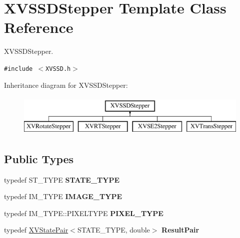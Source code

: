 \hypertarget{class_XVSSDStepper}{
\section{XVSSDStepper  Template Class Reference}
\label{XVSSDStepper}
}
XVSSDStepper. 


{\tt \#include $<$XVSSD.h$>$}

Inheritance diagram for XVSSDStepper:\begin{figure}[H]
\begin{center}
\leavevmode
\includegraphics[height=2cm]{class_XVSSDStepper}
\end{center}
\end{figure}
\subsection*{Public Types}
\begin{CompactItemize}
\item 
typedef ST\_\-TYPE {\bf STATE\_\-TYPE}
\item 
typedef IM\_\-TYPE {\bf IMAGE\_\-TYPE}
\item 
typedef IM\_\-TYPE::PIXELTYPE {\bf PIXEL\_\-TYPE}
\item 
typedef \hyperlink{class_XVStatePair}{XVState\-Pair}$<$STATE\_\-TYPE, double$>$ {\bf Result\-Pair}
\end{CompactItemize}
